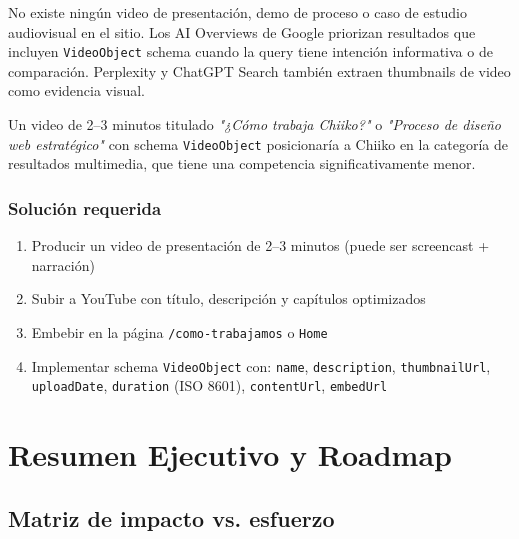 \documentclass[12pt, a4paper]{article}
\begin{document}
No existe ningún video de presentación, demo de proceso o caso de estudio audiovisual en el sitio. Los AI Overviews de Google priorizan resultados que incluyen \texttt{VideoObject} schema cuando la query tiene intención informativa o de comparación. Perplexity y ChatGPT Search también extraen thumbnails de video como evidencia visual.

Un video de 2–3 minutos titulado \textit{"¿Cómo trabaja Chiiko?"} o \textit{"Proceso de diseño web estratégico"} con schema \texttt{VideoObject} posicionaría a Chiiko en la categoría de resultados multimedia, que tiene una competencia significativamente menor.

\subsubsection{Solución requerida}

\begin{enumerate}[itemsep=4pt]
  \item Producir un video de presentación de 2–3 minutos (puede ser screencast + narración)
  \item Subir a YouTube con título, descripción y capítulos optimizados
  \item Embebir en la página \texttt{/como-trabajamos} o \texttt{Home}
  \item Implementar schema \texttt{VideoObject} con: \texttt{name}, \texttt{description}, \texttt{thumbnailUrl}, \texttt{uploadDate}, \texttt{duration} (ISO 8601), \texttt{contentUrl}, \texttt{embedUrl}
\end{enumerate}

\newpage

\section{Resumen Ejecutivo y Roadmap}

\subsection{Matriz de impacto vs. esfuerzo}
\end{document}
